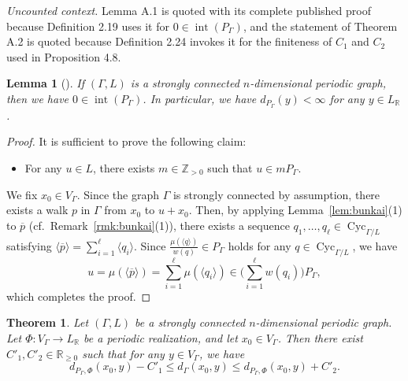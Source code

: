\documentclass[10pt,a4paper]{amsart}
\theoremstyle{plain}
\newtheorem{thm}[cdrthm]{Theorem}
\newtheorem{lem}[cdrthm]{Lemma}
\theoremstyle{definition}
\theoremstyle{remark}
\begin{document}
\noindent\textit{Uncounted context.} Lemma A.1 is quoted with its complete published proof because Definition 2.19 uses it for $0\in\operatorname{int}(P_\Gamma)$, and the statement of Theorem A.2 is quoted because Definition 2.24 invokes it for the finiteness of $C_1$ and $C_2$ used in Proposition 4.8.
\begin{lem}[{\cite[Proposition 21]{Fri13}}]\label{lem:int}
If $(\Gamma, L)$ is a strongly connected $n$-dimensional periodic graph, then 
we have $0 \in \operatorname{int}(P _{\Gamma})$. 
In particular, we have $d_{P _{\Gamma}}(y) < \infty$ for any $y \in L_{\mathbb{R}}$. 
\end{lem}
\begin{proof}
It is sufficient to prove the following claim: 
\begin{itemize}
\item For any $u \in L$, there exists $m \in \mathbb{Z}_{>0}$ such that $u \in m P _{\Gamma}$. 
\end{itemize}
We fix $x_0 \in V_{\Gamma}$. 
Since the graph $\Gamma$ is strongly connected by assumption, 
there exists a walk $p$ in $\Gamma$ from $x_0$ to $u + x_0$. 
Then, by applying Lemma~\ref{lem:bunkai}(1) to $\overline{p}$ (cf.\ Remark~\ref{rmk:bunkai}(1)), 
there exists a sequence $q_1, \ldots, q_{\ell} \in \operatorname{Cyc}_{\Gamma /L}$ satisfying
$\langle \overline{p} \rangle = \sum _{i=1} ^{\ell} \langle q_i \rangle$. 
Since $\frac{\mu (\langle q \rangle)}{w(q)} \in P _{\Gamma}$ holds for any $q \in \operatorname{Cyc}_{\Gamma /L}$, 
we have 
\[
u = \mu ( \langle \overline{p} \rangle ) = \sum _{i=1}^{\ell} \mu(\langle q_i \rangle)
\in \biggl( \sum _{i=1} ^{\ell} w(q_i) \biggr) P _{\Gamma}, 
\]
which completes the proof. 
\end{proof}

\setcounter{cdrthm}{1}
\begin{thm}\label{thm:asymp}
Let $(\Gamma , L)$ be a strongly connected $n$-dimensional periodic graph. 
Let $\Phi\colon V_{\Gamma} \to L_{\mathbb{R}}$ be a periodic realization, 
and let $x_0 \in V_{\Gamma}$. Then there exist $C' _1, C' _2 \in \mathbb{R}_{\ge 0}$ such that 
for any $y \in V _{\Gamma}$, we have 
\[
d_{P_{\Gamma}, \Phi} (x_0, y) - C' _1 \le d_{\Gamma}(x_0, y) \le d_{P_{\Gamma}, \Phi} (x_0,y) + C' _2. 
\]
\end{thm}
\end{document}
